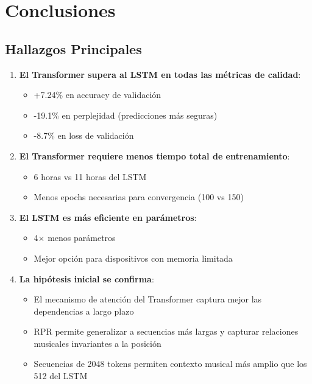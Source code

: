 \documentclass[12pt,a4paper]{article}
\begin{document}
\section{Conclusiones}

\subsection{Hallazgos Principales}

\begin{enumerate}
    \item \textbf{El Transformer supera al LSTM en todas las métricas de calidad}:
    \begin{itemize}
        \item +7.24\% en accuracy de validación
        \item -19.1\% en perplejidad (predicciones más seguras)
        \item -8.7\% en loss de validación
    \end{itemize}

    \item \textbf{El Transformer requiere menos tiempo total de entrenamiento}:
    \begin{itemize}
        \item 6 horas vs 11 horas del LSTM
        \item Menos epochs necesarias para convergencia (100 vs 150)
    \end{itemize}

    \item \textbf{El LSTM es más eficiente en parámetros}:
    \begin{itemize}
        \item 4$\times$ menos parámetros
        \item Mejor opción para dispositivos con memoria limitada
    \end{itemize}

    \item \textbf{La hipótesis inicial se confirma}:
    \begin{itemize}
        \item El mecanismo de atención del Transformer captura mejor las dependencias a largo plazo
        \item RPR permite generalizar a secuencias más largas y capturar relaciones musicales invariantes a la posición
        \item Secuencias de 2048 tokens permiten contexto musical más amplio que los 512 del LSTM
    \end{itemize}
\end{enumerate}
\end{document}
